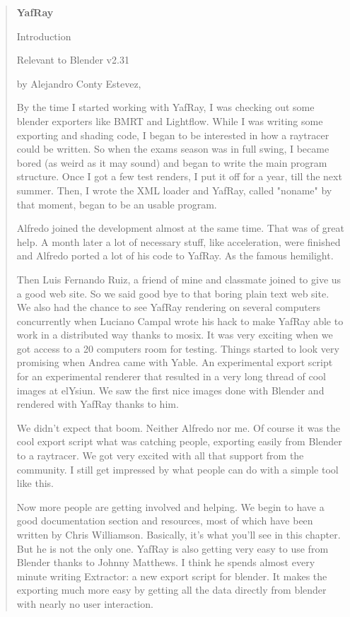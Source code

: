 \begin{quotation}
\textbf{YafRay}

Introduction

Relevant to Blender v2.31

by Alejandro Conty Estevez,

By the time I started working with YafRay, I was checking out some blender exporters like BMRT and Lightflow. While I was writing some exporting and shading code, I began to be interested in how a raytracer could be written. So when the exams season was in full swing, I became bored (as weird as it may sound) and began to write the main program structure. Once I got a few test renders, I put it off for a year, till the next summer. Then, I wrote the XML loader and YafRay, called "noname" by that moment, began to be an usable program.

Alfredo joined the development almost at the same time. That was of great help. A month later a lot of necessary stuff, like acceleration, were finished and Alfredo ported a lot of his code to YafRay. As the famous hemilight.

Then Luis Fernando Ruiz, a friend of mine and classmate joined to give us a good web site. So we said good bye to that boring plain text web site. We also had the chance to see YafRay rendering on several computers concurrently when Luciano Campal wrote his hack to make YafRay able to work in a distributed way thanks to mosix. It was very exciting when we got access to a 20 computers room for testing. Things started to look very promising when Andrea came with Yable. An experimental export script for an experimental renderer that resulted in a very long thread of cool images at elYsiun. We saw the first nice images done with Blender and rendered with YafRay thanks to him.

We didn't expect that boom. Neither Alfredo nor me. Of course it was the cool export script what was catching people, exporting easily from Blender to a raytracer. We got very excited with all that support from the community. I still get impressed by what people can do with a simple tool like this.

Now more people are getting involved and helping. We begin to have a good documentation section and resources, most of which have been written by Chris Williamson. Basically, it's what you'll see in this chapter. But he is not the only one. YafRay is also getting very easy to use from Blender thanks to Johnny Matthews. I think he spends almost every minute writing Extractor: a new export script for blender. It makes the exporting much more easy by getting all the data directly from blender with nearly no user interaction.


\end{quotation}
